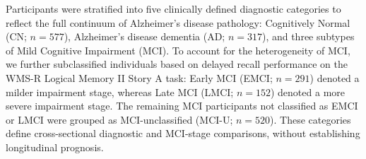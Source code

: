 Participants were stratified into five clinically defined diagnostic categories to reflect the full continuum of Alzheimer’s disease pathology: Cognitively Normal (CN; $n = 577$), Alzheimer’s disease dementia (AD; $n = 317$), and three subtypes of Mild Cognitive Impairment (MCI). To account for the heterogeneity of MCI, we further subclassified individuals based on delayed recall performance on the WMS-R Logical Memory II Story A task: Early MCI (EMCI; $n = 291$) denoted a milder impairment stage, whereas Late MCI (LMCI; $n = 152$) denoted a more severe impairment stage. The remaining MCI participants not classified as EMCI or LMCI were grouped as MCI-unclassified (MCI-U; $n = 520$). These categories define cross-sectional diagnostic and MCI-stage comparisons, without establishing longitudinal prognosis.
